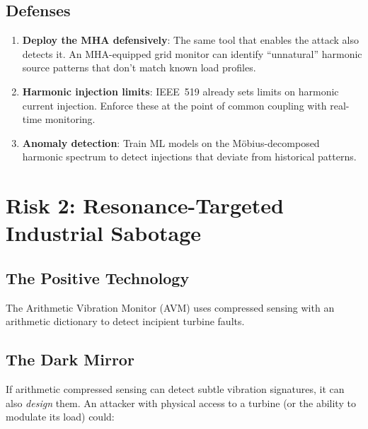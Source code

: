 \documentclass[11pt,a4paper]{article}
\begin{document}
\subsection{Defenses}

\begin{enumerate}
  \item \textbf{Deploy the MHA defensively}: The same tool that
    enables the attack also detects it. An MHA-equipped grid monitor
    can identify ``unnatural'' harmonic source patterns that don't
    match known load profiles.
  \item \textbf{Harmonic injection limits}: IEEE~519 already sets
    limits on harmonic current injection. Enforce these at the
    point of common coupling with real-time monitoring.
  \item \textbf{Anomaly detection}: Train ML models on the
    M\"obius-decomposed harmonic spectrum to detect injections that
    deviate from historical patterns.
\end{enumerate}

\section{Risk 2: Resonance-Targeted Industrial Sabotage}
\label{sec:vibration}

\subsection{The Positive Technology}

The Arithmetic Vibration Monitor (AVM) uses compressed sensing with
an arithmetic dictionary to detect incipient turbine faults.

\subsection{The Dark Mirror}

If arithmetic compressed sensing can detect subtle vibration
signatures, it can also \emph{design} them. An attacker with
physical access to a turbine (or the ability to modulate its load)
could:
\end{document}
